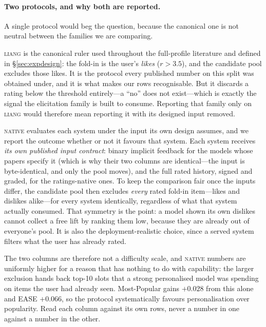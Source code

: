 \documentclass[11pt]{article}
\begin{document}
\paragraph{Two protocols, and why both are reported.}\label{sec:protocols} A single protocol would beg the
question, because the canonical one is not neutral between the families we are comparing.

\textsc{liang} is the canonical ruler used throughout the full-profile literature and defined
in \S\ref{sec:expdesign}: the fold-in is the user's \emph{likes} ($r>3.5$), and the candidate pool excludes
those likes. It is the protocol every published number on this split was obtained under, and it is what
makes our rows recognisable. But it discards a rating below the threshold entirely---a ``no'' does not
exist---which is exactly the signal the elicitation family is built to consume. Reporting that family only
on \textsc{liang} would therefore mean reporting it with its designed input removed.

\textsc{native} evaluates each system under the input its own design assumes, and we report the outcome
whether or not it favours that system. Each system receives \emph{its own published input contract}: binary implicit feedback for the models whose papers specify it (which is why
their two columns are identical---the input is byte-identical, and only the pool moves), and the full rated
history, signed and graded, for the ratings-native ones. To keep the comparison fair once the inputs
differ, the candidate pool then excludes \emph{every} rated fold-in item---likes and dislikes alike---for
every system identically, regardless of what that system actually consumed. That symmetry is the point: a
model shown its own dislikes cannot collect a free lift by ranking them low, because they are already out
of everyone's pool. It is also the deployment-realistic choice, since a served system filters what the user
has already rated.

The two columns are therefore not a difficulty scale, and \textsc{native} numbers are uniformly higher for a
reason that has nothing to do with capability: the larger exclusion hands back top-10 slots that a strong
personalised model was spending on items the user had already seen. Most-Popular gains $+0.028$ from this
alone and EASE $+0.066$, so the protocol systematically favours personalisation over popularity. Read each
column against its own rows, never a number in one against a number in the other.
\end{document}
